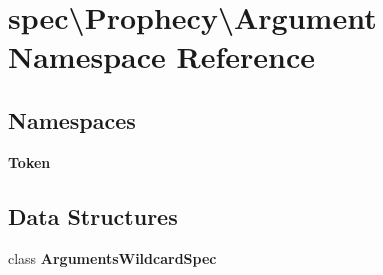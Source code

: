 \section{spec\textbackslash{}Prophecy\textbackslash{}Argument Namespace Reference}
\label{namespacespec_1_1_prophecy_1_1_argument}
\subsection*{Namespaces}
\begin{DoxyCompactItemize}
\item 
 {\bf Token}
\end{DoxyCompactItemize}
\subsection*{Data Structures}
\begin{DoxyCompactItemize}
\item 
class {\bf Arguments\+Wildcard\+Spec}
\end{DoxyCompactItemize}
